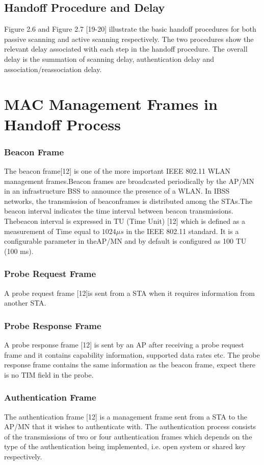 \documentclass[12pt,a4paper]{report}
\begin{document}
\subsection{ Handoff Procedure and Delay}
Figure 2.6 and Figure 2.7 [19-20] illustrate the basic handoff procedures for both passive scanning and active scanning respectively. The two procedures show the relevant delay associated with each step in the handoff procedure. The overall delay is the summation of scanning delay, authentication delay and association/reassociation delay.
\section{MAC Management Frames in Handoff Process}
\subsubsection{Beacon Frame}
The beacon frame[12] is one of the more important IEEE 802.11 WLAN management frames.Beacon frames are broadcasted periodically by the AP/MN in an infrastructure BSS to announce the presence of a WLAN. In IBSS networks, the transmission of beaconframes is distributed among the STAs.The beacon interval indicates the time interval between beacon transmissions. Thebeacon interval is expressed in TU (Time Unit) [12] which is defined as a measurement of Time equal to $1024 \mu s$ in the IEEE 802.11 standard. It is a configurable parameter in theAP/MN and by default is configured as 100 TU (100 ms). 
\subsubsection{Probe Request Frame }
A probe request frame [12]is sent from a STA when it requires information from another STA. 
\subsubsection{Probe Response Frame }
A probe response frame [12] is sent by an AP after receiving a probe request frame and it contains capability information, supported data rates etc. The probe response frame contains the same information as the beacon frame, expect there is no TIM field in the probe.
\subsubsection{Authentication Frame }
The authentication frame [12] is a management frame sent from a STA to the AP/MN that it wishes to authenticate with. The authentication process consists of the transmissions of two or four authentication frames which depends on the type of the authentication being implemented, i.e. open system or shared key respectively. 
\end{document}
